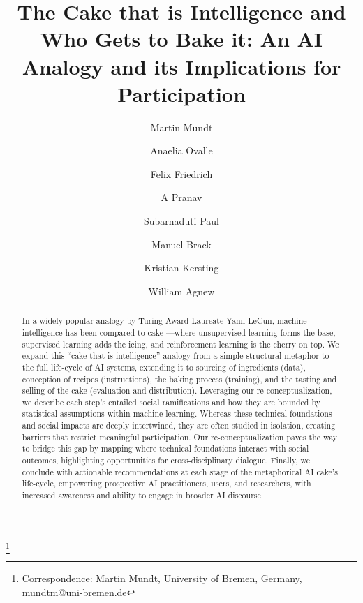 \documentclass[manuscript,screen,authorversion,nonacm]{acmart}
\begin{document}
\title{The Cake that is Intelligence and Who Gets to Bake it: An AI Analogy and its Implications for Participation}

\author{Martin Mundt}
\thanks{Correspondence: Martin Mundt, University of Bremen, Germany, \Letter \, mundtm@uni-bremen.de}

\author{Anaelia Ovalle}

\author{Felix Friedrich}

\author{A Pranav}

\author{Subarnaduti Paul}

\author{Manuel Brack}

\author{Kristian Kersting}
  
\author{William Agnew}

\makeatletter
\let\@authorsaddresses\@empty
\makeatother

\renewcommand{\shortauthors}{Mundt et al.}

\begin{abstract}
\vspace{1em}  
 \newline
In a widely popular analogy by Turing Award Laureate Yann LeCun, machine intelligence has been compared to cake ---where unsupervised learning forms the base, supervised learning adds the icing, and reinforcement learning is the cherry on top.
We expand this ``cake that is intelligence'' analogy from a simple structural metaphor to the full life-cycle of AI systems, extending it to sourcing of ingredients (data), conception of recipes (instructions), the baking process (training), and the tasting and selling of the cake (evaluation and distribution). Leveraging our re-conceptualization, we describe each step's entailed social ramifications and how they are bounded by statistical assumptions within machine learning. Whereas these technical foundations and social impacts are deeply intertwined, they are often studied in isolation, creating barriers that restrict meaningful participation. Our re-conceptualization paves the way
to bridge this gap by mapping where technical foundations interact with social outcomes, highlighting opportunities for cross-disciplinary dialogue. Finally, we conclude with actionable recommendations at each stage of the metaphorical AI cake's life-cycle, empowering prospective AI practitioners, users, and researchers, with increased awareness and ability to engage in broader AI discourse.
\end{abstract}
\end{document}
